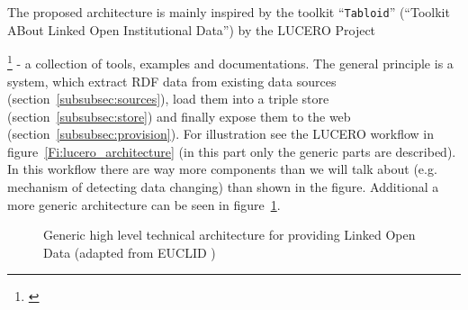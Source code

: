The proposed architecture is mainly inspired by the toolkit ``\texttt{Tabloid}'' (``Toolkit ABout Linked Open Institutional Data'') by the LUCERO Project~{\footnote{\citet{url:lucero-tabloid}} - a collection of tools, examples and documentations. The general principle is a system, which extract RDF data from existing data sources (section~\ref{subsubsec:sources}), load them into a triple store (section~\ref{subsubsec:store}) and finally expose them to the web (section~\ref{subsubsec:provision}). For illustration see the LUCERO workflow in figure~\ref{Fi:lucero_architecture} (in this part only the generic parts are described). In this workflow there are way more components than we will talk about (e.g. mechanism of detecting data changing) than shown in the figure. Additional a more generic architecture can be seen in figure~\ref{Fi:tec_architecture}.

\begin{figure}[htbp]
\centering
{}
\caption[Generic high level technical architecture of a LOD system]{Generic high level technical architecture for providing Linked Open Data (adapted from EUCLID {\cite{simperl_using_2013}})}
\label{Fi:tec_architecture}
\end{figure}

}
